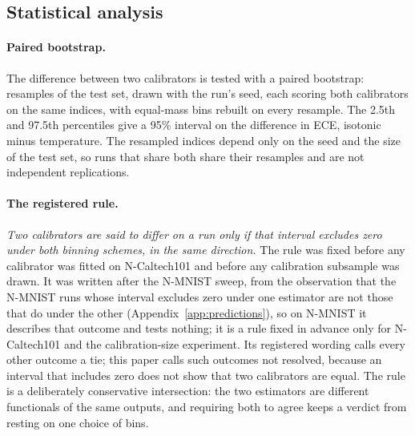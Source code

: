 \documentclass[10pt]{article}
\begin{document}
\subsection{Statistical analysis}
\label{sec:stats}

\paragraph{Paired bootstrap.} The difference between two calibrators is tested with a paired
bootstrap: \nBootstrap{} resamples of the test set, drawn with the run's seed, each scoring both %
calibrators on the same indices, with equal-mass bins rebuilt on every resample. The 2.5th and
97.5th percentiles give a 95\% interval on the difference in ECE, isotonic minus temperature. The
resampled indices depend only on the seed and the size of the test set, so runs that share both
share their resamples and are not independent replications.

\paragraph{The registered rule.} \emph{Two calibrators are said to differ on a run only if that %
interval excludes zero under both binning schemes, in the same direction.} The rule was fixed
before any calibrator was fitted on N-Caltech101 and before any calibration subsample was drawn.
It was written after the N-MNIST sweep, from the observation that the N-MNIST runs whose interval
excludes zero under one estimator are not those that do under the other
(Appendix~\ref{app:predictions}), so on N-MNIST it describes that outcome and tests nothing; it
is a rule fixed in advance only for N-Caltech101 and the calibration-size experiment. Its registered wording calls every other
outcome a tie; this paper calls such outcomes not resolved, because an interval that includes
zero does not show that two calibrators are equal. The rule is a deliberately conservative
intersection: the two estimators are different functionals of the same outputs, and requiring
both to agree keeps a verdict from resting on one choice of bins.
\end{document}
